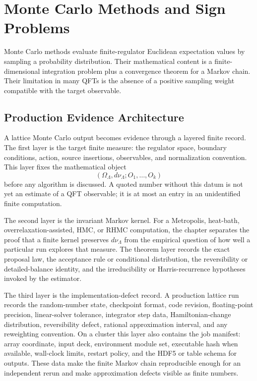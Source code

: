 \chapter{Monte Carlo Methods and Sign Problems}
\label{ch:constructive-monte-carlo-sign-problems}

\ConventionsEuclidean

Monte Carlo methods evaluate finite-regulator Euclidean expectation values by
sampling a probability distribution.  Their mathematical content is a
finite-dimensional integration problem plus a convergence theorem for a
Markov chain.  Their limitation in many QFTs is the absence of a positive
sampling weight compatible with the target observable.

\section{Production Evidence Architecture}
\label{sec:monte-carlo-production-evidence-architecture}

A lattice Monte Carlo output becomes evidence through a layered finite record.
The first layer is the target finite measure: the regulator space, boundary
conditions, action, source insertions, observables, and normalization
convention.  This layer fixes the mathematical object
\[
  (\Omega_\Lambda,d\nu_\Lambda;O_1,\ldots,O_k)
\]
before any algorithm is discussed.  A quoted number without this datum is not
yet an estimate of a QFT observable; it is at most an entry in an unidentified
finite computation.

The second layer is the invariant Markov kernel.  For a Metropolis,
heat-bath, overrelaxation-assisted, HMC, or RHMC computation, the chapter
separates the proof that a finite kernel preserves \(d\nu_\Lambda\) from the
empirical question of how well a particular run explores that measure.  The
theorem layer records the exact proposal law, the acceptance rule or
conditional distribution, the reversibility or detailed-balance identity, and
the irreducibility or Harris-recurrence hypotheses invoked by the estimator.

The third layer is the implementation-defect record.  A production lattice
run records the random-number state, checkpoint format, code revision,
floating-point precision, linear-solver tolerance, integrator step data,
Hamiltonian-change distribution, reversibility defect, rational approximation
interval, and any reweighting convention.  On a cluster this layer also
contains the job manifest: array coordinate, input deck, environment module
set, executable hash when available, wall-clock limits, restart policy, and
the HDF5 or table schema for outputs.  These data make the finite Markov
chain reproducible enough for an independent rerun and make approximation
defects visible as finite numbers.

